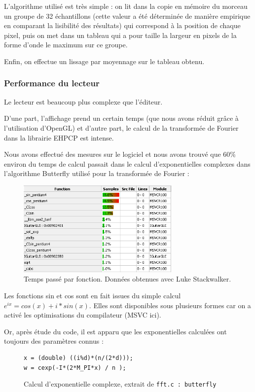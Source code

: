L'algorithme utilisé est très simple : on lit dans la copie en mémoire du morceau un groupe de 32 échantillons
(cette valeur a été déterminée de manière empirique en comparant la lisibilité des résultats) qui correspond à la position de
chaque pixel, puis on met dans un tableau qui a pour taille la largeur en pixels de la forme d'onde le maximum sur ce groupe.

Enfin, on effectue un lissage par moyennage sur le tableau obtenu.

\subsubsection{Performance du lecteur}
Le lecteur est beaucoup plus complexe que l'éditeur.

D'une part, l'affichage prend un certain temps (que nous avons réduit grâce à l'utilisation d'OpenGL)
et d'autre part, le calcul de la transformée de Fourier dans la librairie EHPCP est intense.

Nous avons effectué des mesures sur le logiciel et nous avons trouvé que 60\% environ du temps de calcul
passait dans le calcul d'exponentielles complexes dans l'algorithme Butterfly utilisé pour la transformée de Fourier :

\begin{figure}[H]
\begin{center}
\includegraphics[width=300px]{sincos.png}
\caption{Temps passé par fonction. Données obtenues avec Luke Stackwalker.}
\label{player_performance}
\end{center}
\end{figure}

Les fonctions sin et cos sont en fait issues du simple calcul $e^{ix} = cos(x) + i*sin(x)$.
Elles sont disponibles sous plusieurs formes car on a activé les optimisations du compilateur (MSVC ici).

Or, après étude du code, il est apparu que les exponentielles calculées ont toujours des paramètres connus :
\begin{figure}[H]
\begin{lstlisting}
x = (double) ((i%d)*(n/(2*d)));
w = cexp(-I*(2*M_PI*x) / n );
\end{lstlisting}
\caption{Calcul d'exponentielle complexe, extrait de \texttt{fft.c : butterfly}}
\label{api_cexp}
\end{figure}

